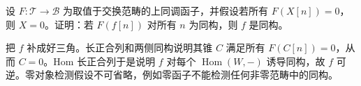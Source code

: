 \begin{exercise}\label{b4:ex:16-cohom-functor-conservative}
设 \(F:\mathcal T\to\mathcal B\) 为取值于交换范畴的上同调函子，并假设若所有 \(F(X[n])=0\)，则 \(X=0\)。证明：若 \(F(f[n])\) 对所有 \(n\) 为同构，则 \(f\) 是同构。
\end{exercise}
\begin{solution}
把 \(f\) 补成好三角。长正合列和两侧同构说明其锥 \(C\) 满足所有 \(F(C[n])=0\)，从而 \(C=0\)。Hom 长正合列于是说明 \(f\) 对每个 \(\operatorname{Hom}(W,-)\) 诱导同构，故 \(f\) 可逆。零对象检测假设不可省略，例如零函子不能检测任何非零范畴中的同构。
\end{solution}
